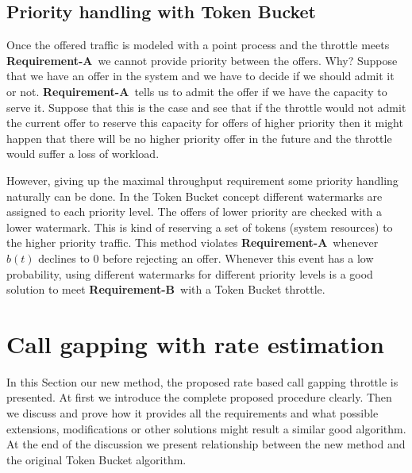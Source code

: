\documentclass[conference]{IEEEtran}
\newcommand{\comment}[1]{}
\newcommand{\reqA}{\textbf{Requirement-A}}
\newcommand{\reqB}{\textbf{Requirement-B}}
\begin{document}
\subsection{Priority handling with Token Bucket}
Once the offered traffic is modeled with a point process and the
throttle meets \reqA\ we cannot provide priority between the offers.
Why? Suppose that we have an offer in the system and we have to
decide if we should admit it or not. \reqA\ tells us to admit the
offer if we have the capacity to serve it. Suppose that this is the
case and see that if the throttle would not admit the current offer
to reserve this capacity for offers of higher priority then it might
happen that there will be no higher priority offer in the future and
the throttle would suffer a loss of workload.

\comment{It is not so obvious problem if the capacity is described
with two parameters that cannot be compared i.e. Token Bucket with
$r,W$.}

However, giving up the maximal throughput requirement some priority
handling naturally can be done. In the Token Bucket concept
different watermarks are assigned to each priority level. The offers
of lower priority are checked with a lower watermark. This is kind
of reserving a set of tokens (system resources) to the higher
priority traffic. This method violates \reqA\ whenever $b(t)$
declines to $0$ before rejecting an offer. Whenever this event has a
low probability, using different watermarks for different priority
levels is a good solution to meet \reqB\ with a Token Bucket
throttle.

\section{Call gapping with rate estimation}\label{section:new-call-gapping-mechanism} In this
Section our new method, the proposed rate based call gapping
throttle is presented. At first we introduce the complete proposed
procedure clearly. Then we discuss and prove how it provides all the
requirements and what possible extensions, modifications or other
solutions might result a similar good algorithm. At the end of the
discussion we present relationship between the new method and the
original Token Bucket algorithm.
\end{document}
